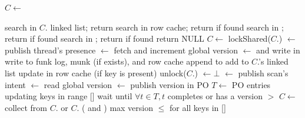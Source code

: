 \begin{algorithm}[tb]
\begin{algorithmic}[1]{}
		\State $C \leftarrow$ 




			\State search  in $C$. linked list;  return 
		\EndIf
		\State search  in row cache; return  if found
			\State	search  in ; return  if found
		\EndIf
		\State	search  in ; return  if found
		\State return NULL	
\EndProcedure
\Statex
{}	
		\State $C \leftarrow$ 
		\State lockShared($C$.)
		\State  {}  $\leftarrow$ 
			 \Comment publish  thread's presence 
		\State {} $\leftarrow$    \Comment fetch and increment global version
		\State  {}  $\leftarrow$ 
			\Comment and write in 
		\Statex \Comment write  to funk log, munk (if exists), and row cache  
		\State append  to 
			\State add   to $C$.'s linked list
		\Else
		\State update  in row cache (if key is present)
		\EndIf
		\State unlock($C$.)
		\State {}  $\leftarrow \bot$ 
\EndProcedure
\Statex
{}
		\State  {}  $\leftarrow$  \Comment publish scan's intent 
		\State {} $\leftarrow$    \Comment read global version
		\State  {}  $\leftarrow$ 
		\Comment publish version in PO
		\State  $T \leftarrow $  PO entries updating keys in range [] 
		\State wait until $\forall t \in T, t$  completes or has a version $>$   
		\State $C \leftarrow$ 
		\Repeat
				\State collect from $C$. or $C$. ( and )
				\Statex \hspace{1cm} max version $\le$ for all keys in [] 


\end{algorithmic}
\end{algorithm}
